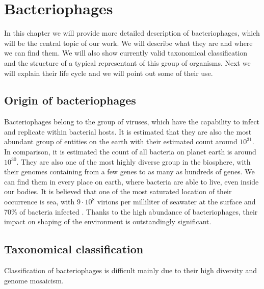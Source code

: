 \chapter{Bacteriophages}
In this chapter we will provide more detailed description of bacteriophages, which will be the central topic of our work.
We will describe what they are and where we can find them.
We will also show currently valid taxonomical classification and the structure of a typical representant of this group of organisms.
Next we will explain their life cycle and we will point out some of their use.

\section{Origin of bacteriophages}
Bacteriophages belong to the group of viruses, which have the capability to infect and replicate within bacterial hosts.
It is estimated that they are also the most abundant group of entities on the earth with their estimated count around $10^{31}$.
In comparison, it is estimated the count of all bacteria on planet earth is around $10^{30}$.
They are also one of the most highly diverse group in the biosphere, with their genomes containing from a few genes to as many as hundreds of genes.
We can find them in every place on earth, where bacteria are able to live, even inside our bodies.
It is believed that one of the most saturated location of their occurrence is sea, with  $9\cdot 10^8$ virions per milliliter of seawater at the surface and 70\% of bacteria infected \cite{virioplankton}. %
Thanks to the high abundance of bacteriophages, their impact on shaping of the environment is outstandingly significant.

\section{Taxonomical classification}
Classification of bacteriophages is difficult mainly due to their high diversity and genome mosaicism. \cite{phagetax}


